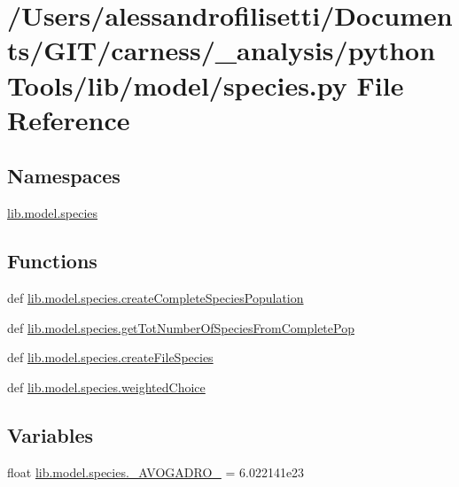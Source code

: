 \hypertarget{a00096}{\section{/\-Users/alessandrofilisetti/\-Documents/\-G\-I\-T/carness/\-\_\-analysis/python\-Tools/lib/model/species.py File Reference}
\label{a00096}
}
\subsection*{Namespaces}
\begin{DoxyCompactItemize}
\item 
\hyperlink{a00148}{lib.\-model.\-species}
\end{DoxyCompactItemize}
\subsection*{Functions}
\begin{DoxyCompactItemize}
\item 
def \hyperlink{a00148_aaa0ed83b7623b65c77b0d583590219ec}{lib.\-model.\-species.\-create\-Complete\-Species\-Population}
\item 
def \hyperlink{a00148_a1c482d162198854303fbcd154fb1ccbf}{lib.\-model.\-species.\-get\-Tot\-Number\-Of\-Species\-From\-Complete\-Pop}
\item 
def \hyperlink{a00148_a0aab4ec6c7d010b885204f0420072f29}{lib.\-model.\-species.\-create\-File\-Species}
\item 
def \hyperlink{a00148_a13eb7af04a51ec15dd79ef70fadc93f4}{lib.\-model.\-species.\-weighted\-Choice}
\end{DoxyCompactItemize}
\subsection*{Variables}
\begin{DoxyCompactItemize}
\item 
float \hyperlink{a00148_a4a6d118da79b62429ea35b64ef429b11}{lib.\-model.\-species.\-\_\-\-A\-V\-O\-G\-A\-D\-R\-O\-\_\-} = 6.\-022141e23
\end{DoxyCompactItemize}
